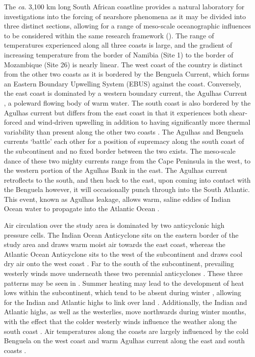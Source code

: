 \documentclass[a4paper,10pt,review]{elsarticle}
\begin{document}
The \emph{ca}. 3,100 km long South African coastline provides a natural laboratory for investigations into the forcing of nearshore phenomena as it may be divided into three distinct sections, allowing for a range of meso-scale oceanographic influences to be considered within the same research framework (). The range of temperatures experienced along all three coasts is large, and the gradient of increasing temperature from the border of Namibia (Site 1) to the border of Mozambique (Site 26) is nearly linear. The west coast of the country is distinct from the other two coasts as it is bordered by the Benguela Current, which forms an Eastern Boundary Upwelling System (EBUS) \citep{Hutchings2009} against the coast. Conversely, the east coast is dominated by a western boundary current, the Agulhas Current \citep{Luning1990}, a poleward flowing body of warm water. The south coast is also bordered by the Agulhas current but differs from the east coast in that it experiences both shear-forced and wind-driven upwelling \citep{Lutjeharms2000a} in addition to having significantly more thermal variability than present along  the other two coasts \citep{Schlegel2017}. The Agulhas and Benguela currents `battle' each other for a position of supremacy along the south coast of the subcontinent and no fixed border between the two exists. The meso-scale dance of these two mighty currents range from the Cape Peninsula in the west, to the western portion of the Agulhas Bank in the east. The Agulhas current  retroflects to the south, and then back to the east, upon coming into contact with the Benguela \citep{Hutchings2009} however, it will occasionally punch through into the South Atlantic. This event, known as Agulhas leakage, allows warm, saline eddies of Indian Ocean water to propagate into the Atlantic Ocean \citep{Beal2011}.

Air circulation over the study area is dominated by two anticyclonic high pressure cells. The Indian Ocean Anticyclone sits on the eastern border of the study area and draws warm moist air towards the east coast, whereas the Atlantic Ocean Anticyclone sits to the west of the subcontinent and draws cool dry air onto the west coast \citep{vanHeerden1998}. Far to the south of the subcontinent, prevailing westerly winds move underneath these two perennial anticyclones \citep{vanHeerden1998}. These three patterns may be seen in . Summer heating may lead to the development of heat lows within the subcontinent, which tend to be absent during winter \citep{Tyson2000}, allowing for the Indian and Atlantic highs to link over land \citep{vanHeerden1998}. Additionally, the Indian and Atlantic highs, as well as the westerlies, move northwards during winter months, with the effect that the colder westerly winds influence the weather along the south coast \citep{vanHeerden1998}. Air temperatures along the coasts are largely influenced by the cold Benguela on the west coast and warm Agulhas current along the east and south coasts \citep{vanHeerden1998}.
\end{document}
